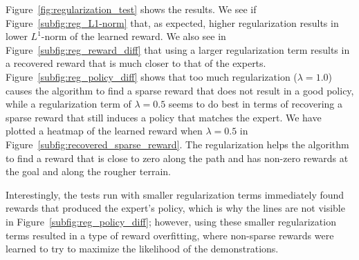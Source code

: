 \documentclass[10pt,a4paper]{article}
\begin{document}
Figure~\ref{fig:regularization_test} shows the results. We see if Figure~\ref{subfig:reg_L1-norm} that, as expected, higher regularization results in lower $L^1$-norm of the learned reward. We also see in Figure~\ref{subfig:reg_reward_diff} that using a larger regularization term results in a recovered reward that is much closer to that of the experts. Figure~\ref{subfig:reg_policy_diff} shows that too much regularization ($\lambda = 1.0$) causes the algorithm to find a sparse reward that does not result in a good policy, while a regularization term of $\lambda = 0.5$ seems to do best in terms of recovering a sparse reward that still induces a policy that matches the expert. We have plotted a heatmap of the learned reward when $\lambda=0.5$ in Figure~\ref{subfig:recovered_sparse_reward}. The regularization helps the algorithm to find a reward that is close to zero along the path and has non-zero rewards at the goal and along the rougher terrain.

 Interestingly, the tests run with smaller regularization terms immediately found rewards that produced the expert's policy, which is why the lines are not visible in Figure~\ref{subfig:reg_policy_diff}; however, using these smaller regularization terms resulted in a type of reward overfitting, where non-sparse rewards were learned to try to maximize the likelihood of the demonstrations.
\end{document}
